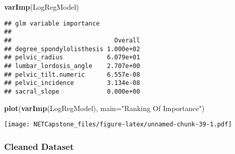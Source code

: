 \documentclass[
]{article}
\newenvironment{Shaded}{\begin{snugshade}}{\end{snugshade}}
\newcommand{\CommentTok}[1]{\textcolor[rgb]{0.56,0.35,0.01}{\textit{#1}}}
\newcommand{\DataTypeTok}[1]{\textcolor[rgb]{0.13,0.29,0.53}{#1}}
\newcommand{\KeywordTok}[1]{\textcolor[rgb]{0.13,0.29,0.53}{\textbf{#1}}}
\newcommand{\NormalTok}[1]{#1}
\newcommand{\OperatorTok}[1]{\textcolor[rgb]{0.81,0.36,0.00}{\textbf{#1}}}
\newcommand{\StringTok}[1]{\textcolor[rgb]{0.31,0.60,0.02}{#1}}
\begin{document}
\begin{Shaded}
\begin{Highlighting}[]
\KeywordTok{varImp}\NormalTok{(LogRegModel)}
\end{Highlighting}
\end{Shaded}

\begin{verbatim}
## glm variable importance
## 
##                            Overall
## degree_spondylolisthesis 1.000e+02
## pelvic_radius            6.079e+01
## lumbar_lordosis_angle    2.707e+00
## pelvic_tilt.numeric      6.557e-08
## pelvic_incidence         3.134e-08
## sacral_slope             0.000e+00
\end{verbatim}

\begin{Shaded}
\begin{Highlighting}[]
\KeywordTok{plot}\NormalTok{(}\KeywordTok{varImp}\NormalTok{(LogRegModel), }\DataTypeTok{main=}\StringTok{"Ranking Of Importance"}\NormalTok{)}
\end{Highlighting}
\end{Shaded}

\texttt{[image: NETCapstone\_files/figure-latex/unnamed-chunk-39-1.pdf]}

\hypertarget{cleaned-dataset-3}{%
\subsubsection{Cleaned Dataset}\label{cleaned-dataset-3}}

\begin{Shaded}
\end{Shaded}
\end{document}
